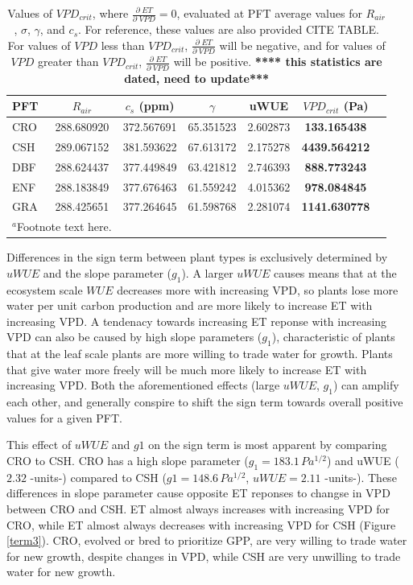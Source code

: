 \documentclass[draft,linenumbers]{agujournal}
\begin{document}
\begin{table}
  \label{vpd_crit}
\caption{Values of $VPD_{crit}$, where $\frac{\partial \; ET}{\partial \; VPD} = 0$, evaluated at PFT average values for $R_{air}$, $\sigma$, $\gamma$, and $c_s$. For reference, these values are also provided CITE TABLE. For values of $VPD$ less than $VPD_{crit}$, $\frac{\partial \; ET}{\partial \; VPD}$ will be negative, and for values of $VPD$ greater than $VPD_{crit}$, $\frac{\partial \; ET}{\partial \; VPD}$ will be positive. \textbf{**** this statistics are dated, need to update***}}
\centering
\begin{tabular}{l c c c c c c}
  \hline
  PFT & $R_{air}$ & $c_s$ (ppm) & $\gamma$ &  uWUE    & \textbf{$VPD_{crit}$ (Pa)} \\
  \hline
  CRO &  288.680920 & 372.567691& 65.351523& 2.602873&  \textbf{133.165438} \\
  CSH &   289.067152& 381.593622& 67.613172& 2.175278& \textbf{4439.564212} \\
  DBF &   288.624437& 377.449849& 63.421812& 2.746393&  \textbf{888.773243} \\
  ENF &  288.183849& 377.676463& 61.559242& 4.015362&  \textbf{978.084845} \\
  GRA &  288.425651& 377.264645& 61.598768& 2.281074& \textbf{1141.630778} \\
\hline
\multicolumn{2}{l}{$^{a}$Footnote text here.}
\end{tabular}
\end{table}

Differences in the sign term between plant types is exclusively determined by $uWUE$ and the slope parameter ($g_1$). A larger $uWUE$ causes means that at the ecosystem scale $WUE$ decreases more with increasing VPD, so plants lose more water per unit carbon production and are more likely to increase ET with increasing VPD. A tendenacy towards increasing ET reponse with increasing VPD can also be caused by high slope parameters ($g_1$), characteristic of plants that at the leaf scale plants are more willing to trade water for growth. Plants that give water more freely will be much more likely to increase ET with increasing VPD.  Both the aforementioned effects (large $uWUE$, $g_1$) can amplify each other, and generally conspire to shift the sign term towards overall positive values for a given PFT.

This effect of $uWUE$ and $g1$ on the sign term is most apparent by comparing CRO to CSH. CRO has a high slope parameter ($g_1 = 183.1 \, Pa^{1/2}$) and uWUE ($2.32$ -units-) compared to CSH ($g1 = 148.6 \, Pa^{1/2}$, $uWUE=2.11$ -units-). These differences in slope parameter cause opposite ET reponses to changse in VPD between CRO and CSH. ET almost always increases with increasing VPD for CRO, while ET almost always decreases with increasing VPD for CSH (Figure \ref{term3}). CRO, evolved or bred to prioritize GPP, are very willing to trade water for new growth, despite changes in VPD, while CSH are very unwilling to trade water for new growth.
\end{document}
